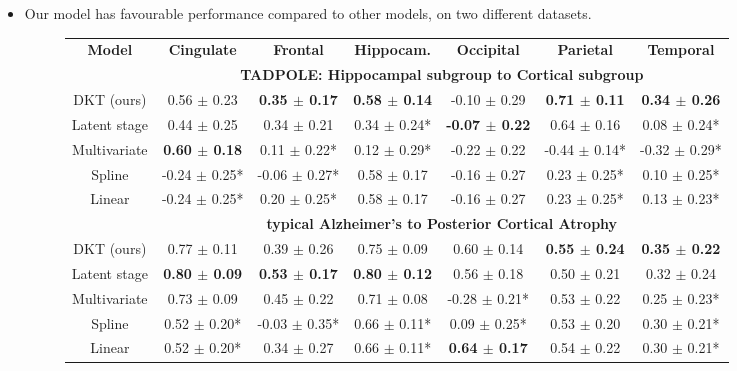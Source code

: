 \documentclass[portrait,a0,final,20pt]{a0poster}
\newcommand{\fnt}[1]{\LARGE{#1}}
\begin{document}
{\begin{multicols}{2}
\begin{itemize}
\item \fnt{Our model has favourable performance compared to other models, on two different datasets.}
\vspace{0.3em}
\begin{figure}[H]
\fontsize{27}{30}\selectfont
\begin{tabular}{c | c c c c c c}
\textbf{Model} & \textbf{Cingulate} & \textbf{Frontal} & \textbf{Hippocam.} & \textbf{Occipital} & \textbf{Parietal} & \textbf{Temporal}\\
& \multicolumn{6}{c}{\textbf{TADPOLE: Hippocampal subgroup to Cortical subgroup}}\\
DKT (ours) &      0.56 $\pm$ 0.23 &    \textbf{0.35 $\pm$ 0.17} &        \textbf{0.58 $\pm$ 0.14} &     -0.10 $\pm$ 0.29 &     \textbf{0.71 $\pm$ 0.11} &     \textbf{0.34 $\pm$ 0.26} \\
Latent stage &      0.44 $\pm$ 0.25 &    0.34 $\pm$ 0.21 &       0.34 $\pm$ 0.24* &     \textbf{-0.07 $\pm$ 0.22} &     0.64 $\pm$ 0.16 &    0.08 $\pm$ 0.24* \\
Multivariate &      \textbf{0.60 $\pm$ 0.18} &   0.11 $\pm$ 0.22* &       0.12 $\pm$ 0.29* &     -0.22 $\pm$ 0.22 &   -0.44 $\pm$ 0.14* &   -0.32 $\pm$ 0.29* \\
Spline &    -0.24 $\pm$ 0.25* &  -0.06 $\pm$ 0.27* &        0.58 $\pm$ 0.17 &     -0.16 $\pm$ 0.27 &    0.23 $\pm$ 0.25* &    0.10 $\pm$ 0.25* \\
Linear &    -0.24 $\pm$ 0.25* &   0.20 $\pm$ 0.25* &        0.58 $\pm$ 0.17 &     -0.16 $\pm$ 0.27 &    0.23 $\pm$ 0.25* &    0.13 $\pm$ 0.23* \\
& \multicolumn{6}{c}{\textbf{typical Alzheimer's to Posterior Cortical Atrophy}}\\
DKT (ours) &    0.77 $\pm$ 0.11 &    0.39 $\pm$ 0.26 &      0.75 $\pm$ 0.09 &    0.60 $\pm$ 0.14 &    \textbf{0.55 $\pm$ 0.24} &    \textbf{0.35 $\pm$ 0.22} \\
Latent stage &    \textbf{0.80 $\pm$ 0.09} &    \textbf{0.53 $\pm$ 0.17} &      \textbf{0.80 $\pm$ 0.12} &    0.56 $\pm$ 0.18 &    0.50 $\pm$ 0.21 &    0.32 $\pm$ 0.24 \\
Multivariate &   0.73 $\pm$ 0.09 &   0.45 $\pm$ 0.22  &    0.71 $\pm$ 0.08 & -0.28 $\pm$ 0.21* &  0.53 $\pm$ 0.22  &  0.25 $\pm$ 0.23* \\
Spline &   0.52 $\pm$ 0.20* &  -0.03 $\pm$ 0.35* &     0.66 $\pm$ 0.11* &   0.09 $\pm$ 0.25* &    0.53 $\pm$ 0.20 &   0.30 $\pm$ 0.21* \\
Linear &   0.52 $\pm$ 0.20* &    0.34 $\pm$ 0.27 &     0.66 $\pm$ 0.11* &    \textbf{0.64 $\pm$ 0.17} &    0.54 $\pm$ 0.22 &   0.30 $\pm$ 0.21* \\
\end{tabular}
\vspace{0.5em}
\label{sec:dktPerfMetrics}
\end{figure}



\end{itemize}
\end{multicols}}
\end{document}
